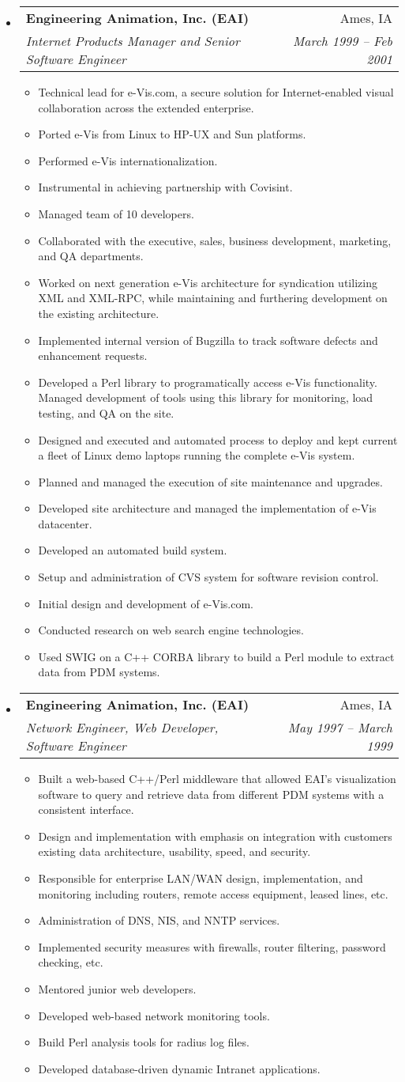 \documentclass[letterpaper,10pt]{article}
\makeatletter
\newcommand{\resitem}[1]{\item #1 \vspace{-2pt}}
\newcommand{\ressubheading}[4]{
\begin{tabular*}{6.5in}{l@{\extracolsep{\fill}}r}
		\textbf{#1} & #2 \\
		\textit{#3} & \textit{#4} \\
\end{tabular*}\vspace{-6pt}}
\makeatother
\begin{document}
\begin{itemize}
\item
    \ressubheading{Engineering Animation, Inc. (EAI)}{Ames, IA}{Internet Products Manager and Senior Software Engineer}{March 1999 -- Feb 2001}
    \begin{itemize}
        \resitem{Technical lead for e-Vis.com, a secure solution for Internet-enabled visual collaboration across the extended enterprise.}
        \resitem{Ported e-Vis from Linux to HP-UX and Sun platforms.}
        \resitem{Performed e-Vis internationalization.}
        \resitem{Instrumental in achieving partnership with Covisint.}
        \resitem{Managed team of 10 developers.}
        \resitem{Collaborated with the executive, sales, business development, marketing, and QA departments.}
        \resitem{Worked on next generation e-Vis architecture for syndication utilizing XML and XML-RPC, while maintaining and furthering development on the existing architecture.}
        \resitem{Implemented internal version of Bugzilla to track software defects and enhancement requests.}
        \resitem{Developed a Perl library to programatically access e-Vis functionality. Managed development of tools using this library for monitoring, load testing, and QA on the site.}
        \resitem{Designed and executed and automated process to deploy and kept current a fleet of Linux demo laptops running the complete e-Vis system.}
        \resitem{Planned and managed the execution of site maintenance and upgrades.}
        \resitem{Developed site architecture and managed the implementation of e-Vis datacenter.}
        \resitem{Developed an automated build system.}
        \resitem{Setup and administration of CVS system for software revision control.}
        \resitem{Initial design and development of e-Vis.com.}
        \resitem{Conducted research on web search engine technologies.}
        \resitem{Used SWIG on a C++ CORBA library to build a Perl module to extract data from PDM systems.}
    \end{itemize}

\item
    \ressubheading{Engineering Animation, Inc. (EAI)}{Ames, IA}{Network Engineer, Web Developer, Software Engineer}{May 1997 -- March 1999}
    \begin{itemize}
        \resitem{Built a web-based C++/Perl middleware that allowed EAI’s visualization software to query and retrieve data from different PDM systems with a consistent interface.}
        \resitem{Design and implementation with emphasis on integration with customers existing data architecture, usability, speed, and security.}
        \resitem{Responsible for enterprise LAN/WAN design, implementation, and monitoring including routers, remote access equipment, leased lines, etc.}
        \resitem{Administration of DNS, NIS, and NNTP services.}
        \resitem{Implemented security measures with firewalls, router filtering, password checking, etc.}
        \resitem{Mentored junior web developers.}
        \resitem{Developed web-based network monitoring tools.}
        \resitem{Build Perl analysis tools for radius log files.}
        \resitem{Developed database-driven dynamic Intranet applications.}
    \end{itemize}

\end{itemize}
\end{document}
